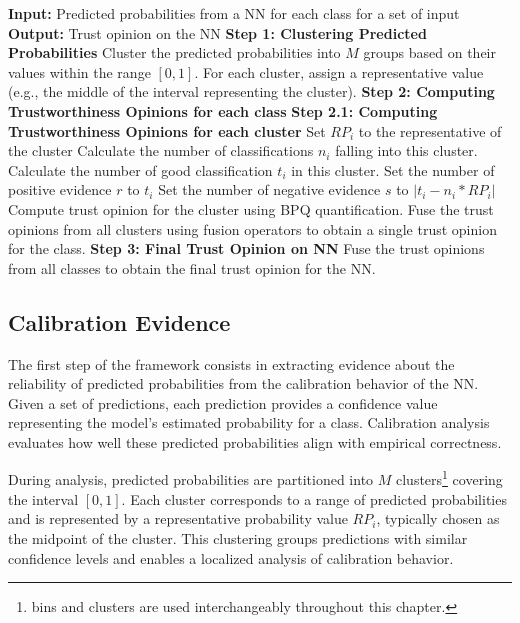 \begin{algorithm}
\caption{Overall Process for Calibration Trust Evaluation}
\begin{algorithmic}[1]
    \State \textbf{Input:} Predicted probabilities from a \ac{NN} for each class for a set of input
    \State \textbf{Output:} Trust opinion on the \ac{NN}
    \State \textbf{Step 1: Clustering Predicted Probabilities}
    \State Cluster the predicted probabilities into \(M\) groups based on their values within the range $[0, 1]$.
    \State For each cluster, assign a representative value (e.g., the middle of the interval representing the cluster).
    \State \textbf{Step 2: Computing Trustworthiness Opinions for each class}
        \State \textbf{Step 2.1: Computing Trustworthiness Opinions for each cluster}
            \State Set $RP_i$ to the representative of the cluster
            \State Calculate the number of classifications $n_i$ falling into this cluster.
            \State Calculate the number of good classification $t_i$ in this cluster.
            \State Set the number of positive evidence $r$ to $t_i$
            \State Set the number of negative evidence $s$ to $\lvert t_i - n_i*RP_i\rvert$
            \State Compute trust opinion for the cluster using \ac{BPQ} quantification.
        \EndFor
        \State Fuse the trust opinions from all clusters using fusion operators to obtain a single trust opinion for the class.
    \EndFor
    \State \textbf{Step 3: Final Trust Opinion on \ac{NN}}
    \State Fuse the trust opinions from all classes to obtain the final trust opinion for the \ac{NN}.
\end{algorithmic}
\label{alg:1}
\end{algorithm}


\subsection{Calibration Evidence}
The first step of the framework consists in extracting evidence about the reliability of predicted probabilities from the calibration behavior of the \ac{NN}. Given a set of predictions, each prediction provides a confidence value representing the model's estimated probability for a class. Calibration analysis evaluates how well these predicted probabilities align with empirical correctness.

During analysis, predicted probabilities are partitioned into $M$ clusters\footnote{bins and clusters are used interchangeably throughout this chapter.} covering the interval $[0,1]$. Each cluster corresponds to a range of predicted probabilities and is represented by a representative probability value $RP_i$, typically chosen as the midpoint of the cluster. This clustering groups predictions with similar confidence levels and
enables a localized analysis of calibration behavior.

